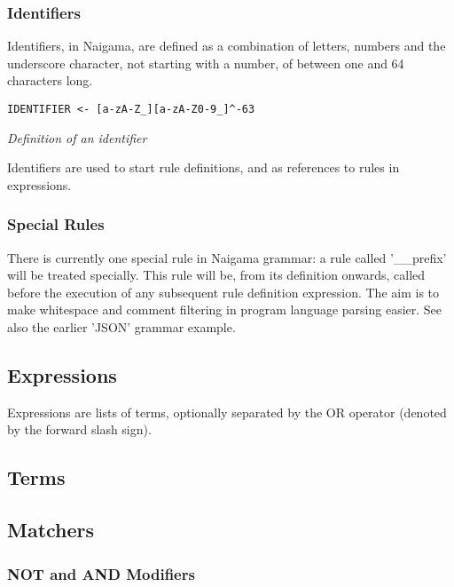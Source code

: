 \subsubsection{Identifiers}

Identifiers, in Naigama, are defined as a combination of letters,
numbers and the underscore character, not starting with a number,
of between one and 64 characters long.

\begin{myquote}
\begin{verbatim}
IDENTIFIER <- [a-zA-Z_][a-zA-Z0-9_]^-63
\end{verbatim}
\end{myquote}
\textit{Definition of an identifier}

Identifiers are used to start rule definitions, and as references
to rules in expressions.

\subsubsection{Special Rules}

There is currently one special rule in Naigama grammar: a rule called
'\_\_prefix' will be treated specially. This rule will be, from its
definition onwards, called before the execution of any subsequent rule
definition expression. The aim is to make whitespace and comment filtering
in program language parsing easier. See also the earlier 'JSON' grammar
example.

\subsection{Expressions}

Expressions are lists of terms, optionally separated by the
OR operator (denoted by the forward slash sign).

\subsection{Terms}

\subsection{Matchers}

\subsubsection{NOT and AND Modifiers}

